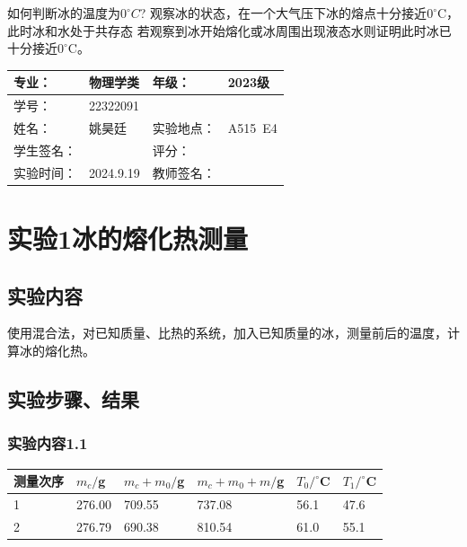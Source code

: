 \documentclass[dvipsnames, svgnames,a4paper,11pt]{article}
\begin{document}
\begin{question}
	如何判断冰的温度为$0^{\circ}C$?
	\tcblower
	观察冰的状态，在一个大气压下冰的熔点十分接近$0^\circ$C，此时冰和水处于共存态
	若观察到冰开始熔化或冰周围出现液态水则证明此时冰已十分接近$0^\circ$C。
\end{question}


\clearpage
{}
\begin{table}
	\renewcommand\arraystretch{1.7}
	\centering
	\begin{tabularx}{\textwidth}{|X|X|X|X|}
	\hline
	专业：& 物理学类 &年级：& 2023级 \\
	\hline
	学号：&22322091 & & \\
	\hline
	姓名：& 姚昊廷 &实验地点：&A515\ E4\\
	\hline
	学生签名：& & 评分： &\\
	\hline
	实验时间：& 2024.9.19& 教师签名：&\\
	\hline
	\end{tabularx}
\end{table}

\section{实验1\hspace{0.3cm}冰的熔化热测量}
\subsection{实验内容}
使用混合法，对已知质量、比热的系统，加入已知质量的冰，测量前后的温度，计算冰的熔化热。
\subsection{实验步骤、结果}
\subsubsection{实验内容1.1}
\begin{table}[!h]
	\renewcommand\arraystretch{1.7}
	\centering
	\begin{tabularx}{\textwidth}{|X|X|X|X|X|X|}
	\hline
	测量次序& $m_c/$g &$m_c+m_0/$g& $m_c+m_0+m/$g&$T_0/^\circ$C&$T_1/^\circ$C \\
	\hline
	1&276.00&709.55&737.08&56.1&47.6\\
	\hline
	2&276.79&690.38&810.54&61.0&55.1\\
	\hline
	\end{tabularx}
\end{table}
\end{document}
